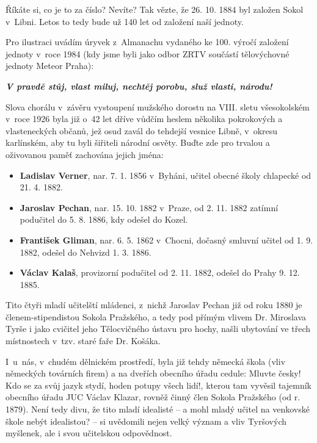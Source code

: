 \documentclass[11pt]{article}
\begin{document}
\clearpage
\nopagecolor
\normalcolor

\restoregeometry
\pagestyle{standard}


Říkáte si, co je to za číslo? Nevíte? Tak vězte, že 26. 10. 1884 byl založen Sokol v~Libni. Letos to tedy bude už 140 let od založení naší jednoty.

Pro ilustraci uvádím úryvek z~Almanachu vydaného ke 100. výročí založení jednoty v~roce 1984 (kdy jsme byli jako odbor ZRTV součástí tělovýchovné jednoty Meteor Praha):


\it
\vspace*{12pt}
\noindent\textbf{V pravdě stůj, vlast miluj, nechtěj porobu, služ vlasti, národu!}

\vspace*{12pt}
\noindent Slova chorálu v~závěru vystoupení mužského dorostu na VIII. sletu všesokolském v~roce 1926 byla již o~42 let dříve vůdčím heslem několika pokrokových a vlasteneckých občanů, jež osud zavál do tehdejší vesnice Libně, v~okresu karlínském, aby tu byli šiřiteli národní osvěty. Buďte zde pro trvalou a oživovanou paměť zachována jejich jména:

\vspace*{6pt}
\begin{itemize}[
  itemsep=-3pt,
  leftmargin=2em,
  itemindent=-1em
]
\item[] \textbf{Ladislav Verner}, nar. 7. 1. 1856 v~Byháni, učitel obecné školy chlapecké od 21. 4. 1882.
\item[] \textbf{Jaroslav Pechan}, nar. 15. 10. 1882 v~Praze, od 2. 11. 1882 zatímní podučitel do 5. 8. 1886, kdy odešel do Kozel.
\item[] \textbf{František Gliman}, nar. 6. 5. 1862 v~Chocni, dočasný smluvní učitel od 1. 9. 1882, odešel do Nehvizd 1. 3. 1886.
\item[] \textbf{Václav Kalaš}, provizorní podučitel od 2. 11. 1882, odešel do Prahy 9. 12. 1885.
\end{itemize}
\vspace*{6pt}
\noindent

Tito čtyři mladí učitelští mládenci, z~nichž Jaroslav Pechan již od roku 1880 je členem-stipendistou Sokola Pražského, a tedy pod přímým vlivem Dr. Miroslava Tyrše i jako cvičitel jeho Tělocvičného ústavu pro hochy, našli ubytování ve třech místnostech v~tzv. staré faře Dr. Košáka.

I~u~nás, v~chudém dělnickém prostředí, byla již tehdy německá škola (vliv německých továrních firem) a na dveřích obecního úřadu cedule: \luv{}Mluvte česky! Kdo se za svůj jazyk stydí, hoden potupy všech lidí!\ruv{}, kterou tam vyvěsil tajemník obecního úřadu JUC Václav Klazar, rovněž činný člen Sokola Pražského (od r. 1879). Není tedy divu, že tito mladí idealisté – a mohl mladý učitel na venkovské škole nebýt idealistou? – si uvědomili nejen velký význam a vliv Tyršových myšlenek, ale i svou učitelskou odpovědnost.
\end{document}
